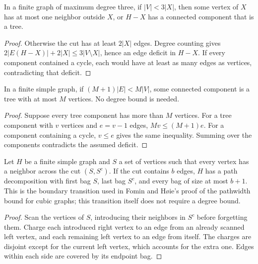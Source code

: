 \begin{theorem}
  \label{thm:lowerbounds-algebraic-boundary-reduction}
  \leanok
  In a finite graph of maximum degree three, if $|V|<3|X|$, then some
  vertex of $X$ has at most one neighbor outside $X$, or $H-X$ has a
  connected component that is a tree.
\end{theorem}
\begin{proof}
  \leanok
  Otherwise the cut has at least $2|X|$ edges. Degree counting gives
  $2|E(H-X)|+2|X|\le 3|V\setminus X|$, hence an edge deficit in $H-X$.
  If every component contained a cycle, each would have at least as many
  edges as vertices, contradicting that deficit.
\end{proof}

\begin{theorem}
  \label{thm:lowerbounds-algebraic-small-tree-component}
  \leanok
  In a finite simple graph, if $(M+1)|E|<M|V|$, some connected
  component is a tree with at most $M$ vertices. No degree bound is needed.
\end{theorem}
\begin{proof}
  \leanok
  Suppose every tree component has more than $M$ vertices. For a tree
  component with $v$ vertices and $e=v-1$ edges, $Mv\le(M+1)e$.
  For a component containing a cycle, $v\le e$ gives the same inequality.
  Summing over the components contradicts the assumed deficit.
\end{proof}

\begin{theorem}
  \label{thm:lowerbounds-algebraic-boundary-transition}
  \leanok
  Let $H$ be a finite simple graph and $S$ a set of vertices such that every
  vertex has a neighbor across the cut $(S,S^c)$. If the cut contains $b$
  edges, $H$ has a path decomposition with first bag $S$, last bag $S^c$,
  and every bag of size at most $b+1$. This is the boundary transition used
  in Fomin and H{\o}ie's proof of the pathwidth bound for cubic graphs;
  this transition itself does not require a degree bound.
\end{theorem}
\begin{proof}
  \leanok
  Scan the vertices of $S$, introducing their neighbors in $S^c$ before
  forgetting them. Charge each introduced right vertex to an edge from an
  already scanned left vertex, and each remaining left vertex to an edge
  from itself. The charges are disjoint except for the current left vertex,
  which accounts for the extra one. Edges within each side are covered by
  its endpoint bag.
\end{proof}

